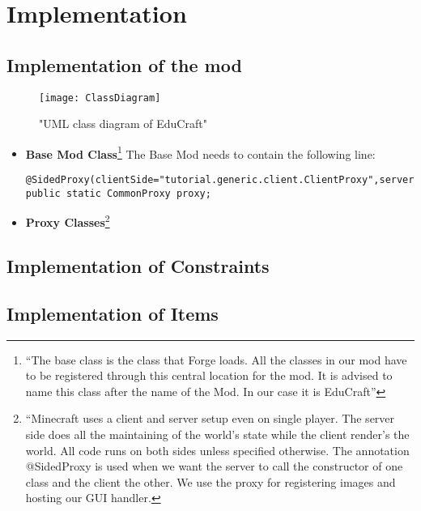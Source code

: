 \chapter{Implementation}
\label{ch:implementation}

\section{Implementation of the mod}

\begin{figure}[h!]
\centering
\texttt{[image: ClassDiagram]}
\caption{"UML class diagram of EduCraft"}
\end{figure}

\begin{itemize}
\item \textbf{Base Mod Class}\footnote{``The base class is the class that Forge loads. All the classes in our mod have to be registered through this central location for the mod. It is advised to name this class after the name of the Mod. In our case it is EduCraft''\cite{website:forge-basemods}}\newline
The Base Mod needs to contain the following line:
\begin{lstlisting}
@SidedProxy(clientSide="tutorial.generic.client.ClientProxy",serverSide="tutorial.generic.CommonProxy")
public static CommonProxy proxy;
\end{lstlisting}

\item \textbf{Proxy Classes}\footnote{``Minecraft uses a client and server setup even on single player. The server side does all the maintaining of the world’s state while the client render’s the world. All code runs on both sides unless specified otherwise.\newline
The annotation @SidedProxy is used when we want the server to call the constructor of one class and the client the other. We use the proxy for registering images and hosting our GUI handler.\cite{website:forge-proxy}}
\end{itemize}

\section{Implementation of Constraints}

\section{Implementation of Items}

